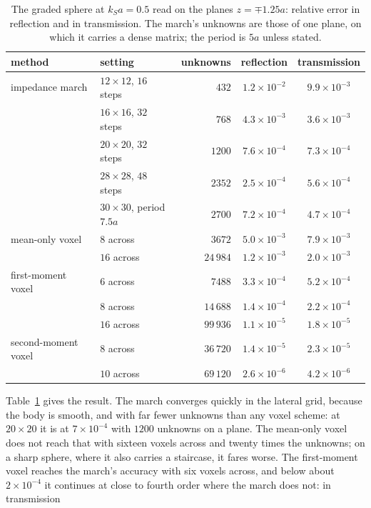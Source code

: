 \documentclass[11pt,a4paper]{article}
\begin{document}
\begin{table}[htbp]
\centering
\caption{The graded sphere at $k_Sa=0.5$ read on the planes $z=\mp1.25a$: relative error in reflection
and in transmission. The march's unknowns are those of one plane, on which it carries a dense matrix;
the period is $5a$ unless stated.}\label{tab:march}
\small
\begin{tabular}{@{}llrcc@{}}
\toprule
method & setting & unknowns & reflection & transmission \\
\midrule
impedance march & $12\times12$, $16$ steps & $432$ & $1.2\times10^{-2}$ & $9.9\times10^{-3}$ \\
 & $16\times16$, $32$ steps & $768$ & $4.3\times10^{-3}$ & $3.6\times10^{-3}$ \\
 & $20\times20$, $32$ steps & $1200$ & $7.6\times10^{-4}$ & $7.3\times10^{-4}$ \\
 & $28\times28$, $48$ steps & $2352$ & $2.5\times10^{-4}$ & $5.6\times10^{-4}$ \\
 & $30\times30$, period $7.5a$ & $2700$ & $7.2\times10^{-4}$ & $4.7\times10^{-4}$ \\
mean-only voxel & $8$ across & $3672$ & $5.0\times10^{-3}$ & $7.9\times10^{-3}$ \\
 & $16$ across & $24\,984$ & $1.2\times10^{-3}$ & $2.0\times10^{-3}$ \\
first-moment voxel & $6$ across & $7488$ & $3.3\times10^{-4}$ & $5.2\times10^{-4}$ \\
 & $8$ across & $14\,688$ & $1.4\times10^{-4}$ & $2.2\times10^{-4}$ \\
 & $16$ across & $99\,936$ & $1.1\times10^{-5}$ & $1.8\times10^{-5}$ \\
second-moment voxel & $8$ across & $36\,720$ & $1.4\times10^{-5}$ & $2.3\times10^{-5}$ \\
 & $10$ across & $69\,120$ & $2.6\times10^{-6}$ & $4.2\times10^{-6}$ \\
\bottomrule
\end{tabular}
\end{table}
Table~\ref{tab:march} gives the result. The march converges quickly in the lateral grid, because the
body is smooth, and with far fewer unknowns than any voxel scheme: at $20\times20$ it is at
$7\times10^{-4}$ with $1200$ unknowns on a plane. The mean-only voxel does not reach that with sixteen
voxels across and twenty times the unknowns; on a sharp sphere, where it also carries a staircase, it
fares worse. The first-moment voxel reaches the march's accuracy with six voxels across, and below
about $2\times10^{-4}$ it continues at close to fourth order where the march does not: in transmission
\end{document}
